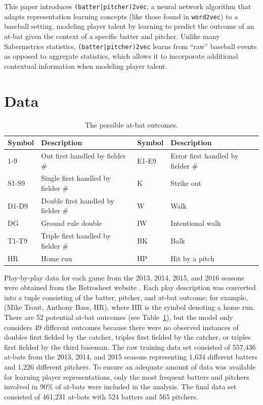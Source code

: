 \documentclass{article}
\begin{document}
This paper introduces \texttt{(batter|pitcher)2vec}, a neural network algorithm that adapts representation learning concepts (like those found in \texttt{word2vec}) to a baseball setting. modeling player talent by learning to predict the outcome of an at-bat given the context of a specific batter and pitcher. Unlike many Sabermetrics statistics, \texttt{(batter|pitcher)2vec} learns from ``raw'' baseball events as opposed to aggregate statistics, which allows it to incorporate additional contextual information when modeling player talent.

\section{Data}
\label{data}

\begin{table}[h]
\caption{The possible at-bat outcomes.}
\centering
\begin{adjustbox}{max width=\textwidth}
    \begin{tabular}{ | l | l | l | l | }
    \hline
    Symbol & Description & Symbol & Description \\ 
    \hline\hline
    1-9 & Out first handled by fielder \# & E1-E9 & Error first handled by fielder \# \\
    \hline
    S1-S9 & Single first handled by fielder \# & K & Strike out \\
    \hline
    D1-D9 & Double first handled by fielder \# & W & Walk \\
    \hline
    DG & Ground rule double & IW & Intentional walk \\
    \hline
    T1-T9 & Triple first handled by fielder \# & BK & Balk \\
    \hline
    HR & Home run & HP & Hit by a pitch \\
    \hline
    \end{tabular}
\end{adjustbox}
\label{table:at_bats}
\end{table}

Play-by-play data for each game from the 2013, 2014, 2015, and 2016 seasons were obtained from the Retrosheet website \parencite{Retro}. Each play description was converted into a tuple consisting of the batter, pitcher, and at-bat outcome; for example, (Mike Trout, Anthony Bass, HR), where HR is the symbol denoting a home run. There are 52 potential at-bat outcomes (see Table~\ref{table:at_bats}), but the model only considers 49 different outcomes because there were no observed instances of doubles first fielded by the catcher, triples first fielded by the catcher, or triples first fielded by the third baseman. The raw training data set consisted of 557,436 at-bats from the 2013, 2014, and 2015 seasons representing 1,634 different batters and 1,226 different pitchers. To ensure an adequate amount of data was available for learning player representations, only the most frequent batters and pitchers involved in 90\% of at-bats were included in the analysis. The final data set consisted of 461,231 at-bats with 524 batters and 565 pitchers.
\end{document}
